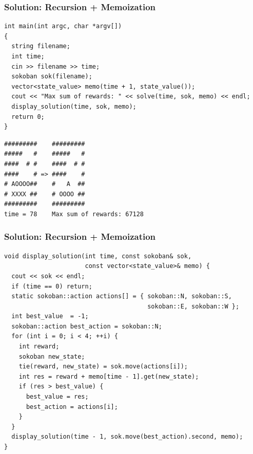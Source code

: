 \documentclass{beamer}
\newcommand{\spojlink}[2]{Sphere Online Judge (http://www.spoj.com)
  problem: \href{#2}{\textcolor{blue}{#1}.}}
\newcounter{exo}
\newcommand{\exo}{
  \addtocounter{exo}{1}
  Exercice \arabic{exo}
}
\begin{document}
\begin{frame}[containsverbatim]
\frametitle{Solution: Recursion + Memoization}

\scriptsize
\begin{lstlisting}
int main(int argc, char *argv[])
{
  string filename;
  int time;
  cin >> filename >> time;
  sokoban sok(filename);
  vector<state_value> memo(time + 1, state_value());
  cout << "Max sum of rewards: " << solve(time, sok, memo) << endl;
  display_solution(time, sok, memo);
  return 0;
}
\end{lstlisting}

\begin{verbatim}
#########    #########
#####   #    #####   #
####  # #    ####  # #
####    # => ####    #
# AOOOO##    #   A  ##
# XXXX ##    # OOOO ##
#########    #########
time = 78    Max sum of rewards: 67128
\end{verbatim}

\end{frame}

\begin{frame}[containsverbatim]
\frametitle{Solution: Recursion + Memoization}

\scriptsize
\begin{lstlisting}
void display_solution(int time, const sokoban& sok,
                      const vector<state_value>& memo) {
  cout << sok << endl;
  if (time == 0) return;
  static sokoban::action actions[] = { sokoban::N, sokoban::S,
                                       sokoban::E, sokoban::W };
  int best_value  = -1;
  sokoban::action best_action = sokoban::N;
  for (int i = 0; i < 4; ++i) {
    int reward;
    sokoban new_state;
    tie(reward, new_state) = sok.move(actions[i]);
    int res = reward + memo[time - 1].get(new_state);
    if (res > best_value) {
      best_value = res;
      best_action = actions[i];
    }
  }
  display_solution(time - 1, sok.move(best_action).second, memo);
}
\end{lstlisting}

\end{frame}


\ifanswers
\end{document}
